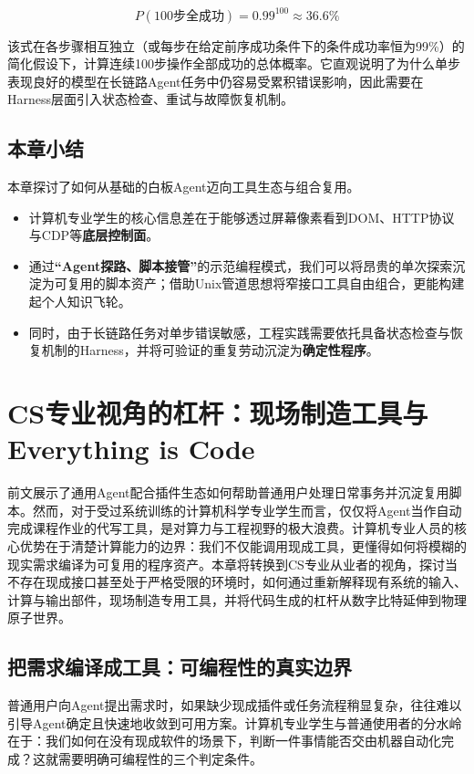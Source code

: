 \documentclass[UTF8,a4paper,11pt,fontset=fandol]{ctexart}
\begin{document}
\[
P(\text{100步全成功}) = 0.99^{100} \approx 36.6\%
\]

该式在各步骤相互独立（或每步在给定前序成功条件下的条件成功率恒为99\%）的简化假设下，计算连续100步操作全部成功的总体概率。它直观说明了为什么单步表现良好的模型在长链路Agent任务中仍容易受累积错误影响，因此需要在Harness层面引入状态检查、重试与故障恢复机制。

\subsection{本章小结}

本章探讨了如何从基础的白板Agent迈向工具生态与组合复用。

\begin{itemize}
\item 计算机专业学生的核心信息差在于能够透过屏幕像素看到DOM、HTTP协议与CDP等\textbf{底层控制面}。

\item 通过\textbf{“Agent探路、脚本接管”}的示范编程模式，我们可以将昂贵的单次探索沉淀为可复用的脚本资产；借助Unix管道思想将窄接口工具自由组合，更能构建起个人知识飞轮。

\item 同时，由于长链路任务对单步错误敏感，工程实践需要依托具备状态检查与恢复机制的Harness，并将可验证的重复劳动沉淀为\textbf{确定性程序}。
\end{itemize}

\section{CS专业视角的杠杆：现场制造工具与Everything is Code}

前文展示了通用Agent配合插件生态如何帮助普通用户处理日常事务并沉淀复用脚本。然而，对于受过系统训练的计算机科学专业学生而言，仅仅将Agent当作自动完成课程作业的代写工具，是对算力与工程视野的极大浪费。计算机专业人员的核心优势在于清楚计算能力的边界：我们不仅能调用现成工具，更懂得如何将模糊的现实需求编译为可复用的程序资产。本章将转换到CS专业从业者的视角，探讨当不存在现成接口甚至处于严格受限的环境时，如何通过重新解释现有系统的输入、计算与输出部件，现场制造专用工具，并将代码生成的杠杆从数字比特延伸到物理原子世界。

\subsection{把需求编译成工具：可编程性的真实边界}

普通用户向Agent提出需求时，如果缺少现成插件或任务流程稍显复杂，往往难以引导Agent确定且快速地收敛到可用方案。计算机专业学生与普通使用者的分水岭在于：我们如何在没有现成软件的场景下，判断一件事情能否交由机器自动化完成？这就需要明确可编程性的三个判定条件。
\end{document}

